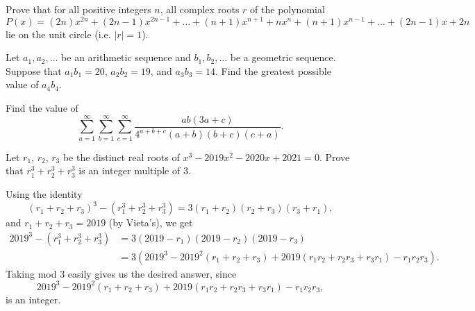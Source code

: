 \begin{question}[name={2019 HMMT, Team, \href{https://artofproblemsolving.com/community/c129h1786137p11795011}{Problem 10}}]
	Prove that for all positive integers $n$, all complex roots $r$ of the polynomial
	\[P(x) = (2n)x^{2n} + (2n-1)x^{2n-1} + \dots + (n+1)x^{n+1} + nx^n + (n+1)x^{n-1} + \dots + (2n-1)x + 2n\]lie on the unit circle (i.e. $|r| = 1$).
\end{question}





\begin{question}[name={2019 HMMT, Algebra \& Number Theory, \href{https://artofproblemsolving.com/community/c129h1786247p11795750}{Problem 5}}]
	Let $a_1, a_2, \dots$ be an arithmetic sequence and $b_1, b_2, \dots$ be a geometric sequence. Suppose that $a_1 b_1 = 20$, $a_2 b_2 = 19$, and $a_3 b_3 = 14$. Find the greatest possible value of $a_4 b_4$.	
\end{question}





\begin{question}[name={2019 HMMT, Algebra \& Number Theory, \href{https://artofproblemsolving.com/community/c129h1786252p11795767}{Problem 7}}]
	Find the value of
	\[\sum_{a = 1}^{\infty} \sum_{b = 1}^{\infty} \sum_{c = 1}^{\infty} \frac{ab(3a + c)}{4^{a+b+c} (a+b)(b+c)(c+a)}.\]
\end{question}



\begin{question}[name={2018-2019 San Diego Power Contest, Winter, \href{https://artofproblemsolving.com/community/c6h2055902p14630262}{Problem 1}}]
	Let $r_1$, $r_2$, $r_3$ be the distinct real roots of $x^3-2019x^2-2020x+2021=0$. Prove that $r_1^3+r_2^3+r_3^3$ is an integer multiple of $3$.
\end{question}

\begin{solution}[name={Solution by freeman66}]
	Using the identity
	$$(r_1+r_2+r_3)^3 - (r^3_1 + r^3_2 + r^3_3) = 3(r_1+r_2)(r_2+r_3)(r_3+r_1),$$and $r_1+r_2+r_3=2019$ (by Vieta's), we get
	\begin{align*}
		2019^3 - (r^3_1 + r^3_2 + r^3_3) &= 3(2019-r_1)(2019-r_2)(2019-r_3) \\
		&= 3(2019^3 - 2019^2 (r_1+r_2+r_3) + 2019 (r_1r_2+r_2r_3+r_3r_1) - r_1r_2r_3).
	\end{align*}
	Taking mod 3 easily gives us the desired answer, since $$2019^3 - 2019^2 (r_1+r_2+r_3) + 2019 (r_1r_2+r_2r_3+r_3r_1) - r_1r_2r_3,$$ is an integer.
\end{solution}



